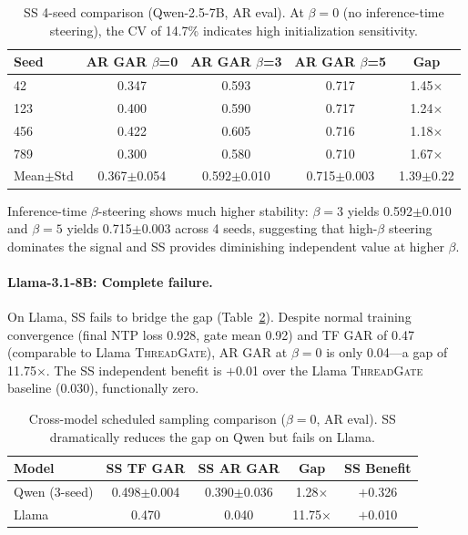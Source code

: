 \documentclass[11pt]{article}
\newcommand{\gar}{\textsc{GAR}}
\newcommand{\tg}{\textsc{ThreadGate}}
\renewcommand{\ss}{\textsc{SS}}
\begin{document}
\begin{table}[t]
\centering
\small
\caption{\ss{} 4-seed comparison (Qwen-2.5-7B, AR eval). At $\beta=0$ (no inference-time steering), the CV of 14.7\% indicates high initialization sensitivity.}
\label{tab:ss_4seed}
\begin{tabular}{lcccc}
\toprule
\textbf{Seed} & \textbf{AR \gar{} $\beta$=0} & \textbf{AR \gar{} $\beta$=3} & \textbf{AR \gar{} $\beta$=5} & \textbf{Gap} \\
\midrule
42 & 0.347 & 0.593 & 0.717 & 1.45$\times$ \\
123 & 0.400 & 0.590 & 0.717 & 1.24$\times$ \\
456 & 0.422 & 0.605 & 0.716 & 1.18$\times$ \\
789 & 0.300 & 0.580 & 0.710 & 1.67$\times$ \\
\midrule
Mean$\pm$Std & 0.367$\pm$0.054 & 0.592$\pm$0.010 & 0.715$\pm$0.003 & 1.39$\pm$0.22 \\
\bottomrule
\end{tabular}
\end{table}

Inference-time $\beta$-steering shows much higher stability: $\beta=3$ yields 0.592$\pm$0.010 and $\beta=5$ yields 0.715$\pm$0.003 across 4 seeds, suggesting that high-$\beta$ steering dominates the signal and SS provides diminishing independent value at higher $\beta$.

\paragraph{Llama-3.1-8B: Complete failure.}
On Llama, SS fails to bridge the gap (Table~\ref{tab:llama_ss}). Despite normal training convergence (final NTP loss 0.928, gate mean 0.92) and TF \gar{} of 0.47 (comparable to Llama \tg{}), AR \gar{} at $\beta=0$ is only 0.04---a gap of 11.75$\times$. The SS independent benefit is $+$0.01 over the Llama \tg{} baseline (0.030), functionally zero.

\begin{table}[t]
\centering
\small
\caption{Cross-model scheduled sampling comparison ($\beta=0$, AR eval). SS dramatically reduces the gap on Qwen but fails on Llama.}
\label{tab:llama_ss}
\begin{tabular}{lcccc}
\toprule
\textbf{Model} & \textbf{SS TF \gar{}} & \textbf{SS AR \gar{}} & \textbf{Gap} & \textbf{SS Benefit} \\
\midrule
Qwen (3-seed) & 0.498$\pm$0.004 & 0.390$\pm$0.036 & 1.28$\times$ & $+$0.326 \\
Llama & 0.470 & 0.040 & 11.75$\times$ & $+$0.010 \\
\bottomrule
\end{tabular}
\end{table}
\end{document}
